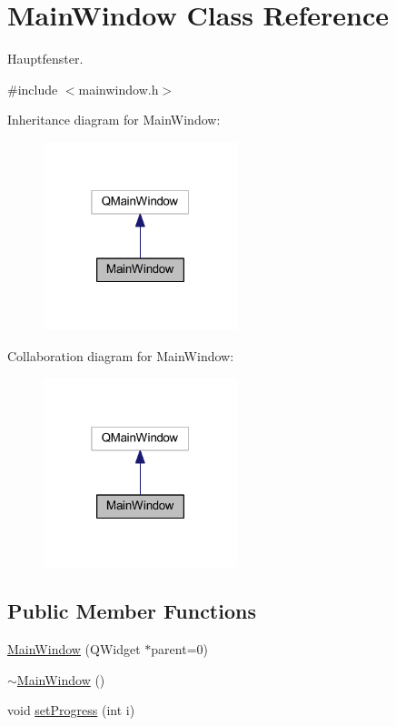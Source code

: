 \hypertarget{class_main_window}{}\section{Main\+Window Class Reference}
\label{class_main_window}


Hauptfenster.  




{\ttfamily \#include $<$mainwindow.\+h$>$}



Inheritance diagram for Main\+Window\+:\nopagebreak
\begin{figure}[H]
\begin{center}
\leavevmode
\includegraphics[width=160pt]{class_main_window__inherit__graph}
\end{center}
\end{figure}


Collaboration diagram for Main\+Window\+:\nopagebreak
\begin{figure}[H]
\begin{center}
\leavevmode
\includegraphics[width=160pt]{class_main_window__coll__graph}
\end{center}
\end{figure}
\subsection*{Public Member Functions}
\begin{DoxyCompactItemize}
\item 
\mbox{\hyperlink{class_main_window_a8b244be8b7b7db1b08de2a2acb9409db}{Main\+Window}} (Q\+Widget $\ast$parent=0)
\item 
\mbox{\hyperlink{class_main_window_ae98d00a93bc118200eeef9f9bba1dba7}{$\sim$\+Main\+Window}} ()
\item 
void \mbox{\hyperlink{class_main_window_ae576381be77310817278e79c978d1135}{set\+Progress}} (int i)
\end{DoxyCompactItemize}


